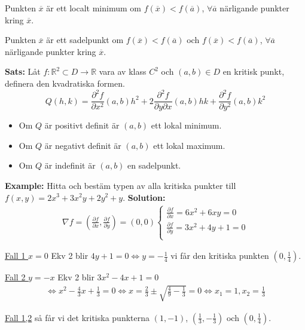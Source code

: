 Punkten $\overline{x}$ är ett localt minimum om $f(\overline{x})<f(\overline{a})$,
$\forall\overline{a}$ närligande punkter kring $\overline{x}$.

Punkten $\overline{x}$ är ett sadelpunkt om $f(\overline{x})<f(\overline{a})$
och $f(\overline{x})<f(\overline{a})$, 
$\forall\overline{a}$ närligande punkter kring $\overline{x}$.

\textbf{Sats:} 
Låt $f:\mathbb{R}^2\subset D\to\mathbb{R}$ vara av klass $C^2$
och $(a,b)\in D$ en kritisk punkt, definera den kvadratiska formen.
\begin{equation*}
    Q(h,k) = \frac{\partial^2 f}{\partial x^2}(a,b)h^2 + 2\frac{\partial^2 f}{\partial y\partial x}(a,b)hk +\frac{\partial^2 f}{\partial y^2}(a,b)k^2 
\end{equation*}
\begin{itemize}
    \item Om $Q$ är positivt definit är $(a,b)$ ett lokal minimum.
    \item Om $Q$ är negativt definit är $(a,b)$ ett lokal maximum.
    \item Om $Q$ är indefinit är $(a,b)$ en sadelpunkt.
\end{itemize}

\textbf{Example:} 
Hitta och bestäm typen av alla kritiska punkter till $f(x,y)=2x^3+3x^2y+2y^2+y$.
\textbf{Solution:} 
\begin{align*}
    \nabla f = \left( \frac{\partial f}{\partial x}, \frac{\partial f}{\partial y} \right) = (0,0)
    \begin{cases}
        \frac{\partial f}{\partial x} = 6x^2 +6xy = 0 \\
        \frac{\partial f}{\partial y} = 3x^2 +4y +1 = 0 \\
    \end{cases}
\end{align*}

\underline{Fall 1 $x=0$} Ekv 2 blir $4y+1=0\Leftrightarrow y=-\frac{1}{4}$
vi får den kritiska punkten $(0,\frac{1}{4})$.

\underline{Fall 2 $y=-x$} Ekv 2 blir $3x^2 -4x +1=0$
\begin{align*}
    \Leftrightarrow x^2 -\frac{4}{3}x +\frac{1}{3}=0
    \Leftrightarrow x= \frac{2}{3} \pm\sqrt{\frac{4}{9}-\frac{1}{3}}=0
    \Leftrightarrow x_1 = 1, x_2 = \frac{1}{3}
\end{align*}

\underline{Fall 1,2} så får vi det kritiska punkterna $(1,-1)$, $(\frac{1}{3}, -\frac{1}{3})$
och $(0,\frac{1}{4})$.

